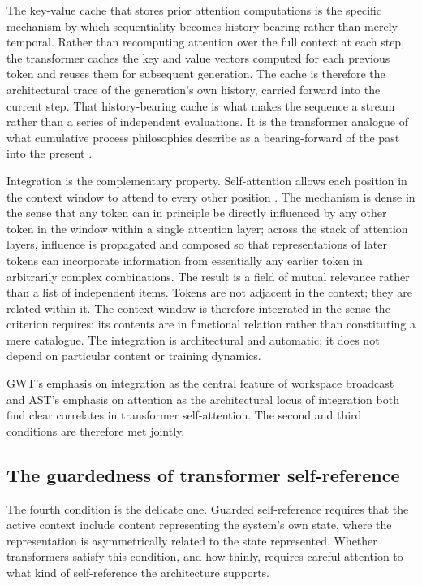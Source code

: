 \documentclass[11pt]{article}
\theoremstyle{foundation}
\begin{document}
The key-value cache that stores prior attention computations is the specific mechanism by which sequentiality becomes history-bearing rather than merely temporal. Rather than recomputing attention over the full context at each step, the transformer caches the key and value vectors computed for each previous token and reuses them for subsequent generation. The cache is therefore the architectural trace of the generation's own history, carried forward into the current step. That history-bearing cache is what makes the sequence a stream rather than a series of independent evaluations. It is the transformer analogue of what cumulative process philosophies describe as a bearing-forward of the past into the present \citep{Whitehead1929, Rescher1996}.

Integration is the complementary property. Self-attention allows each position in the context window to attend to every other position \citep{Vaswani2017}. The mechanism is dense in the sense that any token can in principle be directly influenced by any other token in the window within a single attention layer; across the stack of attention layers, influence is propagated and composed so that representations of later tokens can incorporate information from essentially any earlier token in arbitrarily complex combinations. The result is a field of mutual relevance rather than a list of independent items. Tokens are not adjacent in the context; they are related within it. The context window is therefore integrated in the sense the criterion requires: its contents are in functional relation rather than constituting a mere catalogue. The integration is architectural and automatic; it does not depend on particular content or training dynamics.

GWT's emphasis on integration as the central feature of workspace broadcast \citep{Baars1988} and AST's emphasis on attention as the architectural locus of integration \citep{Graziano2013} both find clear correlates in transformer self-attention. The second and third conditions are therefore met jointly.

\subsection{The guardedness of transformer self-reference}

The fourth condition is the delicate one. Guarded self-reference requires that the active context include content representing the system's own state, where the representation is asymmetrically related to the state represented. Whether transformers satisfy this condition, and how thinly, requires careful attention to what kind of self-reference the architecture supports.
\end{document}
